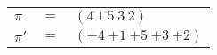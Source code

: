 \begin{example}\label{example:GUELXUJE}
  \hfill
  \begin{\position}
    \begin{tabular}{lll}
      $\pi$  & $=$ & $(4~1~5~3~2)$ \\
      $\pi'$ & $=$ & $({+4}~{+1}~{+5}~{+3}~{+2})$ \\
    \end{tabular}
  \end{\position}
\end{example}